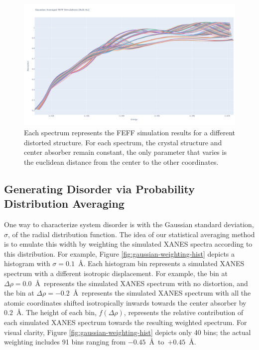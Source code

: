 \begin{figure}[h]
	\centering
	\includegraphics[width=\linewidth]{Chapters/Figures/newplot.png}
	\caption[FEFF Simulations Results]{Each spectrum represents the FEFF simulation results for a different distorted structure. For each spectrum, the crystal structure and center absorber remain constant, the only parameter that varies is the euclidean distance from the center to the other coordinates.}
	\label{fig:feff-results}
\end{figure}

\subsection{Generating Disorder via Probability Distribution Averaging}

One way to characterize system disorder is with the Gaussian standard deviation, $ \sigma $, of the radial distribution function. The idea of our statistical averaging method is to emulate this width by weighting the simulated XANES spectra according to this distribution. For example, Figure \ref{fig:gaussian-weighting-hist} depicts a histogram with $ \sigma=0.1 $~\AA. Each histogram bin represents a simulated XANES spectrum with a different isotropic displacement. For example, the bin at $ \Delta\rho=0.0 $~\AA~represents the simulated XANES spectrum with no distortion, and the bin at $ \Delta\rho=-0.2 $~\AA~represents the simulated XANES spectrum with all the atomic coordinates shifted isotropically inwards towards the center absorber by $ 0.2 $~\AA. The height of each bin, $ f(\Delta\rho) $, represents the relative contribution of each simulated XANES spectrum towards the resulting weighted spectrum. For visual clarity, Figure \ref{fig:gaussian-weighting-hist} depicts only 40 bins; the actual weighting includes 91 bins ranging from $ -0.45 $~\AA~to~$ +0.45 $~\AA.

